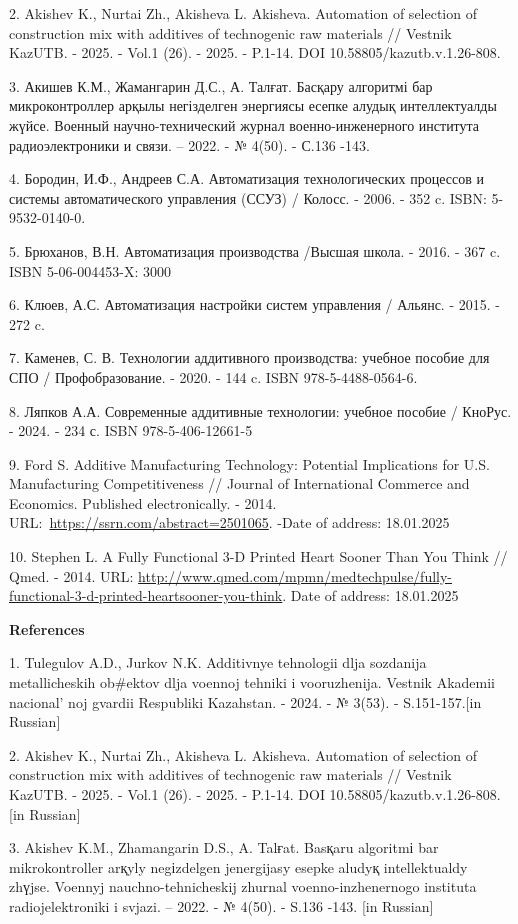 2. Akishev K., Nurtai Zh., Akisheva L. Akisheva. Automation of selection
of construction mix with additives of technogenic raw materials //
Vestnik KazUTB. - 2025. - Vol.1 (26). - 2025. - P.1-14. DOI
10.58805/kazutb.v.1.26-808.

3. Акишев К.М., Жамангарин Д.С., А. Талғат. Басқару алгоритмі бар
микроконтроллер арқылы негізделген энергиясы есепке алудық
интеллектуалды жүйсе. Военный научно-технический журнал
военно-инженерного института радиоэлектроники и связи. -- 2022. - №
4(50). - С.136 -143.

4. Бородин, И.Ф., Андреев С.А. Автоматизация технологических процессов и
системы автоматического управления (ССУЗ) / Колосс. - 2006. - 352 c.
ISBN: 5-9532-0140-0.

5. Брюханов, В.Н. Автоматизация производства /Высшая школа. - 2016. -
367 c. ISBN 5-06-004453-X: 3000

6. Клюев, А.С. Автоматизация настройки систем управления / Альянс. -
2015. - 272 c.

7. Каменев, С. В. Технологии аддитивного производства: учебное пособие
для СПО / Профобразование. - 2020. - 144 c. ISBN 978-5-4488-0564-6.

8. Ляпков А.А. Современные аддитивные технологии: учебное пособие /
КноРус. - 2024. - 234 с. ISBN 978-5-406-12661-5

9. Ford S. Additive Manufacturing Technology: Potential Implications for
U.S. Manufacturing Competitiveness // Journal of International Commerce
and Economics. Published electronically. - 2014.
URL:~\url{https://ssrn.com/abstract=2501065}. -Date of address:
18.01.2025

10. Stephen L. A Fully Functional 3-D Printed Heart Sooner Than You
Think // Qmed. - 2014. URL:
\url{http://www.qmed.com/mpmn/medtechpulse/fully-functional-3-d-printed-heartsooner-you-think}.
Date of address: 18.01.2025

{\bfseries References}

1. Tulegulov A.D., Jurkov N.K. Additivnye tehnologii dlja sozdanija
metallicheskih ob\#ektov dlja voennoj tehniki i vooruzhenija. Vestnik
Akademii nacional' noj gvardii Respubliki Kazahstan. -
2024. - № 3(53). - S.151-157.{[}in Russian{]}

2. Akishev K., Nurtai Zh., Akisheva L. Akisheva. Automation of selection
of construction mix with additives of technogenic raw materials //
Vestnik KazUTB. - 2025. - Vol.1 (26). - 2025. - P.1-14. DOI
10.58805/kazutb.v.1.26-808. {[}in Russian{]}

3. Akishev K.M., Zhamangarin D.S., A. Talғat. Basқaru algoritmі bar
mikrokontroller arқyly negіzdelgen jenergijasy esepke aludyқ
intellektualdy zhүjse. Voennyj nauchno-tehnicheskij zhurnal
voenno-inzhenernogo instituta radiojelektroniki i svjazi. -- 2022. - №
4(50). - S.136 -143. {[}in Russian{]}

